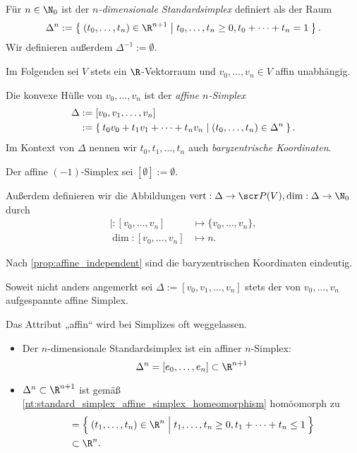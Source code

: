 \begin{df}[Standardsimplex]
	Für $n \in \N_0$ ist der \emph{$n$-dimensionale Standardsimplex} definiert als der Raum
	\[
		\Delta^n := \Set{ (t_0, \dotsc, t_n) \in \R^{n+1} | t_0, \dotsc, t_n \ge 0, t_0 + \dotsb + t_n = 1 }.
	\]
	Wir definieren außerdem $\Delta^{-1} := \emptyset$.
\end{df}

\begin{conv}
	Im Folgenden sei $V$ stets ein $\R$-Vektorraum und $v_0, \dotsc, v_n \in V$ affin unabhängig.
\end{conv}

\begin{df}
	Die konvexe Hülle von $v_0, \dotsc, v_n$ ist der \emph{affine $n$-Simplex}
	\begin{align*}
		\Delta
		&:= [v_0, v_1, \dotsc, v_n] \\
		&:= \Set{ t_0v_0 + t_1v_1 + \dotsb + t_nv_n | (t_0, \dotsc, t_n) \in \Delta^n }.
	\end{align*}
	Im Kontext von $\Delta$ nennen wir $t_0, t_1, \dotsc, t_n$ auch \emph{baryzentrische Koordinaten}.

	Der affine $(-1)$-Simplex sei $[\emptyset] := \emptyset$.

	Außerdem definieren wir die Abbildungen $\vert: \Delta \to \scr P(V), \dim: \Delta \to \N_0$ durch
	\begin{align*}
		\vert: [v_0, \dotsc, v_n] &\mapsto \{v_0, \dotsc, v_n\}, \\
		\dim: [v_0, \dotsc, v_n] &\mapsto n.
	\end{align*}
	\begin{note}
		Nach \ref{prop:affine_independent} sind die baryzentrischen Koordinaten eindeutig.
	\end{note}
\end{df}

\begin{conv}
	Soweit nicht anders angemerkt sei $\Delta := [v_0, v_1, \dotsc, v_n]$ stets der von $v_0, \dotsc, v_n$ aufgespannte affine Simplex.

	Das Attribut „affin“ wird bei Simplizes oft weggelassen.
\end{conv}

\begin{ex}
	\begin{itemize}
		\item
			Der $n$-dimensionale Standardsimplex ist ein affiner $n$-Simplex:
			\[
				\Delta^n = [e_0, \dotsc, e_n] \subset \R^{n+1}
			\]
		\item
			$\Delta^n \subset \R^{n+1}$ ist gemäß \ref{nt:standard_simplex_affine_simplex_homeomorphism} homöomorph zu
			\begin{align*}
				[0,e_1,\dotsc,e_n]
				&= \Set{ (t_1, \dotsc, t_n) \in \R^n \;\Big|\; t_1, \dotsc, t_n \ge 0, t_1 + \dotsb + t_n \le 1 } \\
				&\subset \R^n.
			\end{align*}
	\end{itemize}
\end{ex}


